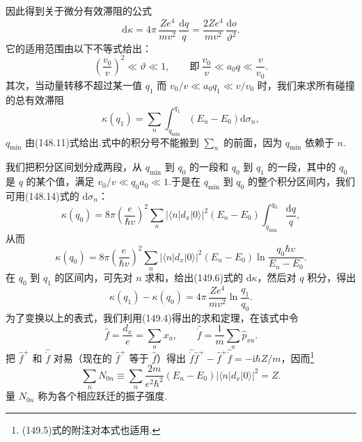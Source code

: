 因此得到关于微分有效滞阻的公式
\begin{equation}
  \mathrm{d}\kappa=4\pi\,\frac{Ze^4}{mv^2}\,\frac{\mathrm{d}q}{q}
  =\frac{2Ze^4}{mv^2}\,\frac{\mathrm{d}o}{\vartheta^2}.
\end{equation}
它的适用范围由以下不等式给出：
\begin{equation*}
  \left(\frac{v_0}{v}\right)^2\ll\vartheta\ll1,\qquad
  \text{即}\ \frac{v_0}{v}\ll a_0q\ll\frac{v}{v_0}.
\end{equation*}
其次，当动量转移不超过某一值 $q_1$ 而 $v_0/v\ll a_0q_1\ll v/v_0$ 时，我们来求所有碰撞的总有效滞阻
\begin{equation}
  \kappa(q_1)=\sum_n\int_{q_{\mathrm{min}}}^{q_1}\left(E_n-E_0\right)\mathrm{d}\sigma_n,
\end{equation}
$q_{\mathrm{min}}$ 由(148.11)式给出.式中的积分号不能搬到 $\sum_n$ 的前面，因为 $q_{\mathrm{min}}$ 依赖于 $n$.

我们把积分区间划分成两段，从 $q_{\mathrm{min}}$ 到 $q_0$ 的一段和 $q_0$ 到 $q_1$ 的一段，其中的 $q_0$ 是 $q$ 的某个值，满足 $v_0/v\ll q_0a_0\ll1$.于是在 $q_{\mathrm{min}}$ 到 $q_0$ 的整个积分区间内，我们可用(148.14)式的 $\mathrm{d}\sigma_n$：
\begin{equation*}
  \kappa(q_0)=8\pi\left(\frac{e}{\hbar v}\right)^2\sum_n
  |\langle n|d_x|0\rangle|^2\left(E_n-E_0\right)
  \int_{q_{\mathrm{min}}}^{q_0}\frac{\mathrm{d}q}{q},
\end{equation*}
从而
\begin{equation}
  \kappa(q_0)=8\pi\left(\frac{e}{\hbar v}\right)^2\sum_n
  |\langle n|d_x|0\rangle|^2\left(E_n-E_0\right)
  \ln\frac{q_0\hbar v}{E_n-E_0}.
\end{equation}
在 $q_0$ 到 $q_1$ 的区间内，可先对 $n$ 求和，给出(149.6)式的 $\mathrm{d}\kappa$，然后对 $q$ 积分，得出
\begin{equation}
  \kappa(q_1)-\kappa(q_0)=4\pi\,\frac{Ze^4}{mv^2}\ln\frac{q_1}{q_0}.
\end{equation}
为了变换以上的表式，我们利用(149.4)得出的求和定理，在该式中令
\begin{equation*}
  \hat{f}=\frac{d_x}{e}=\sum_ax_a,\qquad
  \hat{\dot{f}}=\frac{1}{m}\sum_a\hat{p}_{xa}.
\end{equation*}
把 $\hat{f}^{+}$ 和 $\hat{\dot{f}}$ 对易（现在的 $\hat{f}^{+}$ 等于 $\hat{f}$）得出
$\hat{\dot{f}}\hat{f}^{+}-\hat{f}^{+}\hat{\dot{f}}=-\mathrm{i}\hbar Z/m$，因而\footnote{(149.5)式的附注对本式也适用.}
\begin{equation}
  \sum_nN_{0n}\equiv\sum_n\frac{2m}{e^2\hbar^2}\left(E_n-E_0\right)
  |\langle n|d_x|0\rangle|^2=Z.
\end{equation}
量 $N_{0n}$ 称为各个相应跃迁的振子强度.

